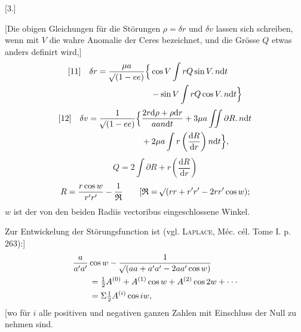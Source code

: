 \begingroup
\setlength{\abovedisplayskip}{8pt plus2pt minus1pt}
\setlength{\belowdisplayskip}{8pt plus2pt minus1pt}
\setlength{\abovedisplayshortskip}{4pt plus2pt}
\setlength{\belowdisplayshortskip}{6pt plus2pt minus1pt}
\par\bigskip
\hypertarget{native-387-ceres3}{}
\begin{center}[3.]\end{center}
\noindent\hspace*{\parindent}[Die obigen Gleichungen für die Störungen \(\rho=\delta r\) und \(\delta v\) lassen sich schreiben, wenn mit \(V\) die wahre Anomalie der Ceres bezeichnet, und die Grösse \(Q\) etwas anders definirt wird,]
\[
\begin{aligned}
{}[11]\quad\delta r=\frac{\mu a}{\mathord{{}^{}\!\surd}(1-ee)}\Big\{&\cos V\int rQ\sin V\mathord{.}\,n\mathrm{d}t\\
&-\sin V\int rQ\cos V\mathord{.}\,n\mathrm{d}t\Big\}
\end{aligned}
\]
\[
\begin{aligned}
{}[12]\quad\delta v=\frac{1}{\mathord{{}^{}\!\surd}(1-ee)}\Big\{&\frac{2r\mathrm{d}\rho+\rho\mathrm{d}r}{aan\mathrm{d}t}+3\mu a\iint\partial R\mathord{.}\,n\mathrm{d}t\\
&+2\mu a\int r\left(\frac{\mathrm{d}R}{\mathrm{d}r}\right)n\mathrm{d}t\Big\},
\end{aligned}
\]
\noindent[wo]
\[Q=2\int\partial R+r\left(\frac{\mathrm{d}R}{\mathrm{d}r}\right)\]
\[
R=\frac{r\cos w}{r'r'}-\frac{1}{\mathfrak{R}}\qquad
[\mathfrak{R}=\mathord{{}^{}\!\surd}(rr+r'r'-2rr'\cos w);
\]
\noindent\(w\) ist der von den beiden Radiis vectoribus eingeschlossene Winkel.

Zur Entwickelung der Störungsfunction ist (vgl. \textsc{Laplace}, Méc. cél. Tome I. p. 263):]
\[
\begin{aligned}
&\frac{a}{a'a'}\cos w-\frac{1}{\mathord{{}^{}\!\surd}(aa+a'a'-2aa'\cos w)}\\
&\qquad=\tfrac12 A^{(0)}+A^{(1)}\cos w+A^{(2)}\cos2w+\cdot\cdot\cdot\\
&\qquad=\Sigma\tfrac12 A^{(i)}\cos iw,
\end{aligned}
\]
\noindent[wo für \(i\) alle positiven und negativen ganzen Zahlen mit Einschluss der Null zu nehmen sind.

